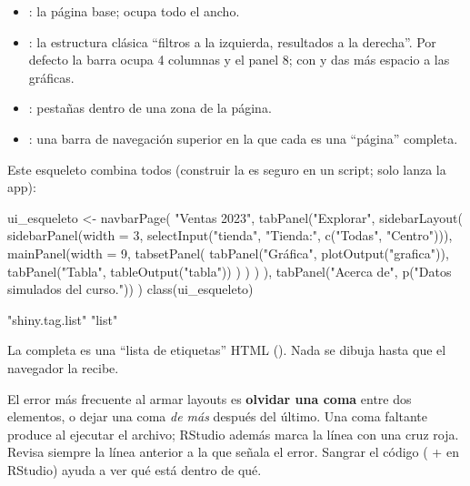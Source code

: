 \begin{itemize}
  \item {}: la página base; ocupa todo el ancho.
  \item {}: la
        estructura clásica ``filtros a la izquierda, resultados a la
        derecha''. Por defecto la barra ocupa 4 columnas y el panel 8; con
         y  das más espacio a las
        gráficas.
  \item {}: pestañas
        dentro de una zona de la página.
  \item {}: una barra de
        navegación superior en la que cada  es una
        ``página'' completa.
\end{itemize}

Este esqueleto combina todos (construir la  es seguro en un
script; solo  lanza la app):

\begin{rcode}
ui_esqueleto <- navbarPage(
  "Ventas 2023",
  tabPanel("Explorar",
    sidebarLayout(
      sidebarPanel(width = 3,
                   selectInput("tienda", "Tienda:", c("Todas", "Centro"))),
      mainPanel(width = 9,
        tabsetPanel(
          tabPanel("Gráfica", plotOutput("grafica")),
          tabPanel("Tabla", tableOutput("tabla"))
        )
      )
    )
  ),
  tabPanel("Acerca de", p("Datos simulados del curso."))
)
class(ui_esqueleto)
\end{rcode}
\begin{rsalida}
[1] "shiny.tag.list" "list"          
\end{rsalida}

La  completa es una ``lista de etiquetas'' HTML
(). Nada se dibuja hasta que el navegador la recibe.

\begin{advertencia}
El error más frecuente al armar layouts es \textbf{olvidar una coma} entre
dos elementos, o dejar una coma \emph{de más} después del último. Una coma
faltante produce  al ejecutar el archivo;
RStudio además marca la línea con una cruz roja. Revisa siempre la línea
anterior a la que señala el error. Sangrar el código ( +
 en RStudio) ayuda a ver qué está dentro de qué.
\end{advertencia}


